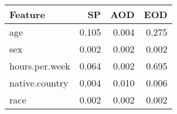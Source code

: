 \begin{tabular}{lrrr}
\toprule
Feature & SP & AOD & EOD \\
\midrule
age & 0.105 & 0.004 & 0.275 \\
sex & 0.002 & 0.002 & 0.002 \\
hours.per.week & 0.064 & 0.002 & 0.695 \\
native.country & 0.004 & 0.010 & 0.006 \\
race & 0.002 & 0.002 & 0.002 \\
\bottomrule
\end{tabular}
